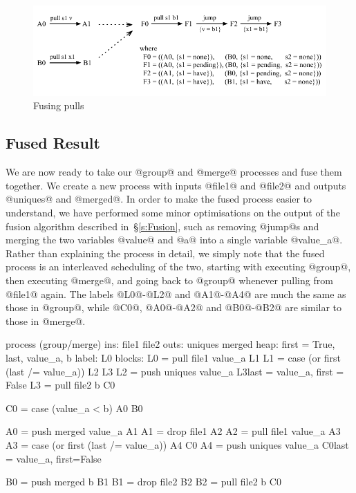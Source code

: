\begin{figure}
\includegraphics[scale=1.1]{figures/fuse-pull-pull.pdf}
\caption{Fusing pulls}
\label{fig:Fusion:Pulls}
\end{figure}

\subsection{Fused Result}

We are now ready to take our @group@ and @merge@ processes and fuse them together. 
We create a new process with inputs @file1@ and @file2@ and outputs @uniques@ and @merged@.
In order to make the fused process easier to understand, we have performed some minor optimisations on the output of the fusion algorithm described in~\S\ref{s:Fusion}, such as removing @jump@s and merging the two variables @value@ and @a@ into a single variable @value_a@.
Rather than explaining the process in detail, we simply note that the fused process is an interleaved scheduling of the two, starting with executing @group@, then executing @merge@, and going back to @group@ whenever pulling from @file1@ again.
The labels @L0@-@L2@ and @A1@-@A4@ are much the same as those in @group@, while @C0@, @A0@-@A2@ and @B0@-@B2@ are similar to those in @merge@.

\begin{code}
process (group/merge)
     ins: file1 file2
    outs: uniques merged
    heap: {first = True, last, value_a, b}
   label: L0
  blocks: L0 = pull file1   value_a               L1
          L1 = case (or first (last /= value_a))  L2    L3
          L2 = push uniques value_a               L3{last = value_a, first = False}
          L3 = pull file2 b                       C0

          C0 = case (value_a < b)                 A0    B0

          A0 = push merged  value_a               A1
          A1 = drop file1                         A2
          A2 = pull file1   value_a               A3
          A3 = case (or first (last /= value_a))  A4    C0
          A4 = push uniques value_a               C0{last = value_a, first=False}

          B0 = push merged b                      B1
          B1 = drop file2                         B2
          B2 = pull file2  b                      C0
\end{code}


